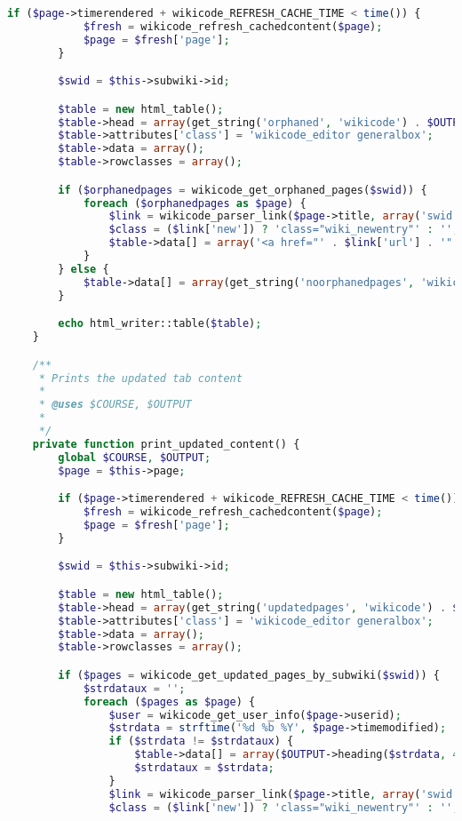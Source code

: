 \begin{lstlisting}[language=PHP]
        if ($page->timerendered + wikicode_REFRESH_CACHE_TIME < time()) {
            $fresh = wikicode_refresh_cachedcontent($page);
            $page = $fresh['page'];
        }

        $swid = $this->subwiki->id;

        $table = new html_table();
        $table->head = array(get_string('orphaned', 'wikicode') . $OUTPUT->help_icon('orphaned', 'wikicode'));
        $table->attributes['class'] = 'wikicode_editor generalbox';
        $table->data = array();
        $table->rowclasses = array();

        if ($orphanedpages = wikicode_get_orphaned_pages($swid)) {
            foreach ($orphanedpages as $page) {
                $link = wikicode_parser_link($page->title, array('swid' => $swid));
                $class = ($link['new']) ? 'class="wiki_newentry"' : '';
                $table->data[] = array('<a href="' . $link['url'] . '"' . $class . '>' . format_string($link['content']) . '</a>');
            }
        } else {
            $table->data[] = array(get_string('noorphanedpages', 'wikicode'));
        }

        echo html_writer::table($table);
    }

    /**
     * Prints the updated tab content
     *
     * @uses $COURSE, $OUTPUT
     *
     */
    private function print_updated_content() {
        global $COURSE, $OUTPUT;
        $page = $this->page;

        if ($page->timerendered + wikicode_REFRESH_CACHE_TIME < time()) {
            $fresh = wikicode_refresh_cachedcontent($page);
            $page = $fresh['page'];
        }

        $swid = $this->subwiki->id;

        $table = new html_table();
        $table->head = array(get_string('updatedpages', 'wikicode') . $OUTPUT->help_icon('updatedpages', 'wikicode'));
        $table->attributes['class'] = 'wikicode_editor generalbox';
        $table->data = array();
        $table->rowclasses = array();

        if ($pages = wikicode_get_updated_pages_by_subwiki($swid)) {
            $strdataux = '';
            foreach ($pages as $page) {
                $user = wikicode_get_user_info($page->userid);
                $strdata = strftime('%d %b %Y', $page->timemodified);
                if ($strdata != $strdataux) {
                    $table->data[] = array($OUTPUT->heading($strdata, 4));
                    $strdataux = $strdata;
                }
                $link = wikicode_parser_link($page->title, array('swid' => $swid));
                $class = ($link['new']) ? 'class="wiki_newentry"' : '';


\end{lstlisting}

